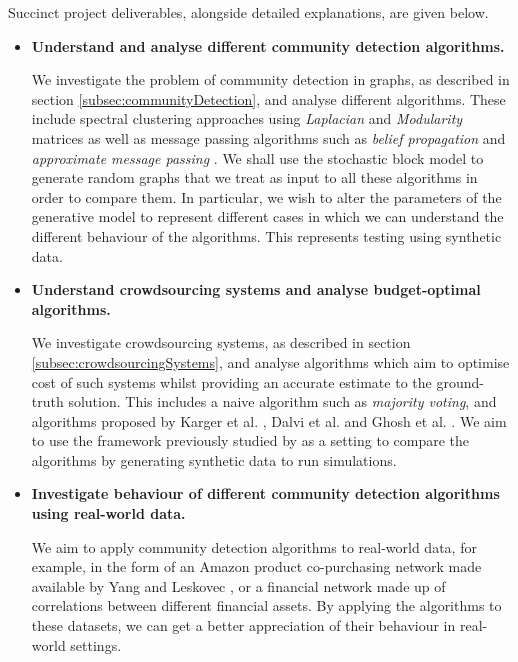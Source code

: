 \documentclass[12pt]{article}
\numberwithin{equation}{section}
\begin{document}
Succinct project deliverables, alongside detailed explanations, are given below.
\begin{itemize}
	\item \textbf{Understand and analyse different community detection algorithms.}

	We investigate the problem of community detection in graphs, as described in section \ref{subsec:communityDetection}, and analyse different algorithms. These include spectral clustering approaches using \textit{Laplacian} \cite{Spi07,Spi12} and \textit{Modularity} \cite{New06a,New06b} matrices as well as message passing algorithms such as \textit{belief propagation} \cite{DKM+13} and \textit{approximate message passing} \cite{BM11}. We shall use the stochastic block model to generate random graphs that we treat as input to all these algorithms in order to compare them. In particular, we wish to alter the parameters of the generative model to represent different cases in which we can understand the different behaviour of the algorithms. This represents testing using synthetic data.

	\item \textbf{Understand crowdsourcing systems and analyse budget-optimal algorithms.}

	We investigate crowdsourcing systems, as described in section \ref{subsec:crowdsourcingSystems}, and analyse algorithms which aim to optimise cost of such systems whilst providing an accurate estimate to the ground-truth solution. This includes a naive algorithm such as \textit{majority voting}, and algorithms proposed by Karger et al. \cite{KOS13}, Dalvi et al. \cite{DDK+13} and Ghosh et al. \cite{GKM11}. We aim to use the framework previously studied by \cite{KOS13,DDK+13} as a setting to compare the algorithms by generating synthetic data to run simulations.

	\item \textbf{Investigate behaviour of different community detection algorithms using real-world data.}

	We aim to apply community detection algorithms to real-world data, for example, in the form of an Amazon product co-purchasing network made available by Yang and Leskovec \cite{YL12}, or a financial network made up of correlations between different financial assets. By applying the algorithms to these datasets, we can get a better appreciation of their behaviour in real-world settings.
\end{itemize}

\end{document}
